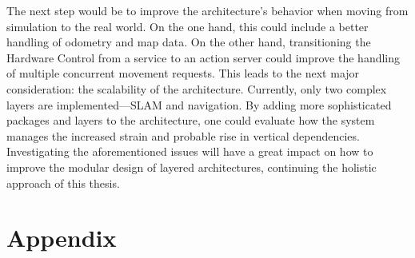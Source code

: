\documentclass[%
paper=A4,               %
twoside=true,           %
openright,              %
11pt,                   %
bibliography=totoc,     %
titlepage=on,           %
DIV=12,                 %
BCOR=1.5cm,             %
parskip=half,            %
final
]{scrreprt}
\begin{document}
	The next step would be to improve the architecture's behavior when moving from simulation to the real world. On the one hand, this could include a better handling of odometry and map data. On the other hand, transitioning the Hardware Control from a service to an action server could improve the handling of multiple concurrent movement requests. \newline
	This leads to the next major consideration: the scalability of the architecture. Currently, only two complex layers are implemented—SLAM and navigation. By adding more sophisticated packages and layers to the architecture, one could evaluate how the system manages the increased strain and probable rise in vertical dependencies.
	Investigating the aforementioned issues will have a great impact on how to improve the modular design of layered architectures, continuing the holistic approach of this thesis. 
	
	\printbibliography
	
	\chapter*{Appendix}
		
\end{document}
